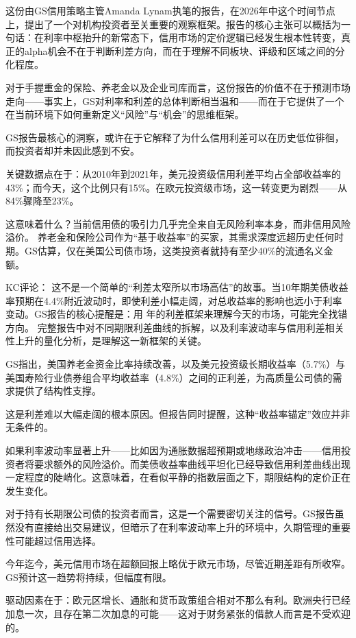 \documentclass[11pt]{ctexart}
\begin{document}
这份由GS信用策略主管Amanda Lynam执笔的报告，在2026年中这个时间节点上，提出了一个对机构投资者至关重要的观察框架。报告的核心主张可以概括为一句话：在利率中枢抬升的新常态下，信用市场的定价逻辑已经发生根本性转变，真正的alpha机会不在于判断利差方向，而在于理解不同板块、评级和区域之间的分化程度。

对于手握重金的保险、养老金以及企业司库而言，这份报告的价值不在于预测市场走向——事实上，GS对利率和利差的总体判断相当温和——而在于它提供了一个在当前环境下如何重新定义“风险”与“机会”的思维框架。

GS报告最核心的洞察，或许在于它解释了为什么信用利差可以在历史低位徘徊，而投资者却并未因此感到不安。

关键数据点在于：从2010年到2021年，美元投资级信用利差平均占全部收益率的43\%；而今天，这个比例只有15\%。在欧元投资级市场，这一转变更为剧烈——从84\%骤降至23\%。

这意味着什么？当前信用债的吸引力几乎完全来自无风险利率本身，而非信用风险溢价。 养老金和保险公司作为“基于收益率”的买家，其需求深度远超历史任何时期。GS估算，仅在美国公司债市场，这类投资者就持有至少40\%的流通名义金额。

KC评论： 这不是一个简单的“利差太窄所以市场高估”的故事。当10年期美债收益率预期在4.4\%附近波动时，即使利差小幅走阔，对总收益率的影响也远小于利率变动。GS报告的核心提醒是：用 年的利差框架来理解今天的市场，可能完全找错方向。 完整报告中对不同期限利差曲线的拆解，以及利率波动率与信用利差相关性上升的量化分析，是理解这一新框架的关键。

GS指出，美国养老金资金比率持续改善，以及美元投资级长期收益率（5.7\%）与美国寿险行业债券组合平均收益率（4.8\%）之间的正利差，为高质量公司债的需求提供了结构性支撑。

这是利差难以大幅走阔的根本原因。但报告同时提醒，这种“收益率锚定”效应并非无条件的。

如果利率波动率显著上升——比如因为通胀数据超预期或地缘政治冲击——信用投资者将要求额外的风险溢价。而美债收益率曲线平坦化已经导致信用利差曲线出现一定程度的陡峭化。这意味着，在看似平静的指数层面之下，期限结构的定价正在发生变化。

对于持有长期限公司债的投资者而言，这是一个需要密切关注的信号。GS报告虽然没有直接给出交易建议，但暗示了在利率波动率上升的环境中，久期管理的重要性可能超过信用选择。

今年迄今，美元信用市场在超额回报上略优于欧元市场，尽管近期差距有所收窄。GS预计这一趋势将持续，但幅度有限。

驱动因素在于：欧元区增长、通胀和货币政策组合相对不那么有利。欧洲央行已经加息一次，且存在第二次加息的可能——这对于财务紧张的借款人而言是不受欢迎的。
\end{document}
